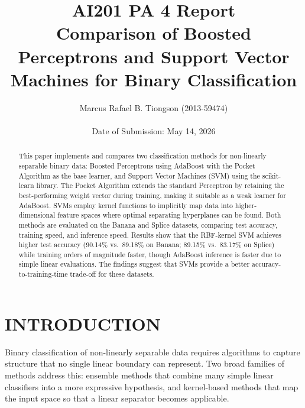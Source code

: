 \documentclass{acm_proc_article-sp}
\begin{document}
\title{AI201 PA 4 Report\\Comparison of Boosted Perceptrons and Support Vector Machines for Binary Classification}

\author{
\alignauthor Marcus Rafael B. Tiongson (2013-59474)\\
~\\
Date of Submission: May 14, 2026
}

\maketitle

\begin{abstract}
This paper implements and compares two classification methods for non-linearly separable binary data: Boosted Perceptrons using AdaBoost with the Pocket Algorithm as the base learner, and Support Vector Machines (SVM) using the scikit-learn library. The Pocket Algorithm extends the standard Perceptron by retaining the best-performing weight vector during training, making it suitable as a weak learner for AdaBoost. SVMs employ kernel functions to implicitly map data into higher-dimensional feature spaces where optimal separating hyperplanes can be found. Both methods are evaluated on the Banana and Splice datasets, comparing test accuracy, training speed, and inference speed. Results show that the RBF-kernel SVM achieves higher test accuracy (90.14\% vs.\ 89.18\% on Banana; 89.15\% vs.\ 83.17\% on Splice) while training orders of magnitude faster, though AdaBoost inference is faster due to simple linear evaluations. The findings suggest that SVMs provide a better accuracy-to-training-time trade-off for these datasets.
\end{abstract}


\section{INTRODUCTION}

Binary classification of non-linearly separable data requires algorithms to capture structure that no single linear boundary can represent. Two broad families of methods address this: ensemble methods that combine many simple linear classifiers into a more expressive hypothesis, and kernel-based methods that map the input space so that a linear separator becomes applicable.
\end{document}

